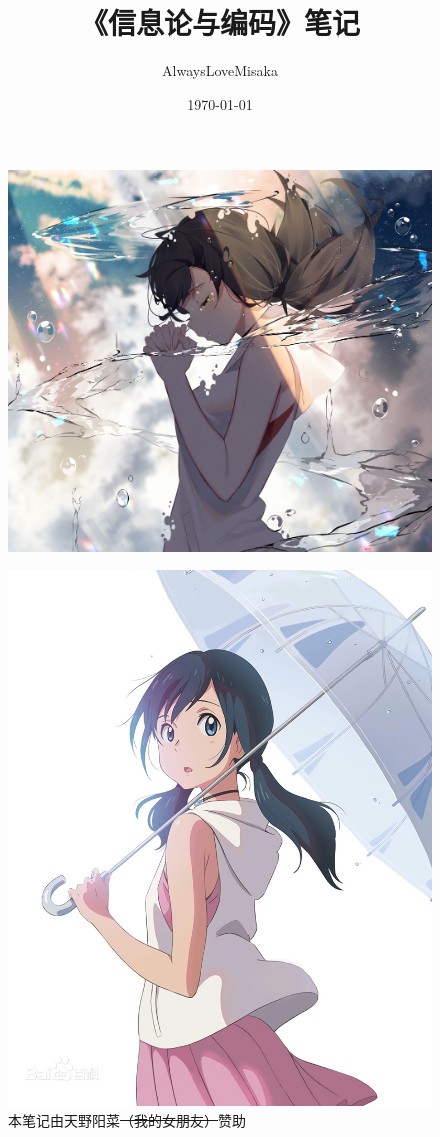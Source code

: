 \documentclass[UTF8,a4paper,11pt]{article}
\title{\huge\heiti《信息论与编码》笔记}
\author{AlwaysLoveMisaka}
\date{\today}
\begin{document}
\maketitle
\thispagestyle{empty}
\begin{figure}[htbp]
\centering
\includegraphics[scale=0.27]{first.jpg}
\end{figure}
\clearpage

\tableofcontents
\setcounter{page}{1}
\begin{figure}[htbp]
\centering
\includegraphics[scale=0.3]{p0.jpg}
\caption*{本笔记由天野阳菜\sout{（我的女朋友）}赞助}
\end{figure}
\clearpage
\end{document}

